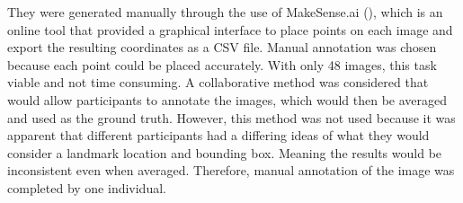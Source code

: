 \documentclass{l4proj}
\begin{document}

They were generated manually through the use of MakeSense.ai (\cite{makesense}), which is an online tool that provided a graphical interface to place points on each image and export the resulting coordinates as a CSV file. Manual annotation was chosen because each point could be placed accurately. With only 48 images, this task viable and not time consuming. A collaborative method was considered that would allow participants to annotate the images, which would then be averaged and used as the ground truth. However, this method was not used because it was apparent that different participants had a differing ideas of what they would consider a landmark location and bounding box. Meaning the results would be inconsistent even when averaged. Therefore, manual annotation of the image was completed by one individual.
\end{document}
